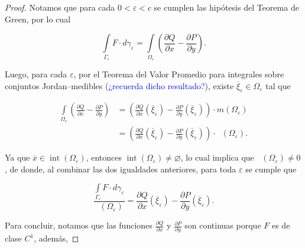 \documentclass[
]{krantz}
\theoremstyle{definition}
\renewcommand{\epsilon}{\varepsilon}  %
\renewcommand{\emptyset}{\varnothing}  %
\theoremstyle{definition}
\theoremstyle{definition}
\theoremstyle{definition}
\theoremstyle{remark}
\begin{document}
\begin{proof}
\iffalse{} {Proof. } \fi{}Notamos que para cada \(0< \epsilon<c\) se cumplen las hipótesis del Teorema de Green, por lo cual

\begin{equation*}
            \displaystyle \int\limits_{\Gamma_{\epsilon}} F\cdot d\gamma_{\epsilon} = \int\limits_{\Omega_{\epsilon}} \left( \frac{\partial Q}{\partial x} - \frac{\partial P}{\partial y} \right).
\end{equation*}

Luego, para cada \(\epsilon\), por el Teorema del Valor Promedio para integrales sobre conjuntos Jordan--medibles (\textcolor{blue}{¿recuerda dicho resultado?}), existe \(\overline{\xi}_{\epsilon}\in \Omega_{\epsilon}\) tal que

\begin{align*}
            \int\limits_{\Omega_{\epsilon}} \left( \frac{\partial Q}{\partial x} - \frac{\partial P}{\partial y} \right) & = \left( \frac{\partial Q}{\partial x}\left(\overline{\xi}_{\epsilon}\right) - \frac{\partial P}{\partial y}\left(\overline{\xi}_{\epsilon}\right) \right) \cdot m\left( \Omega_{\epsilon}\right) \\
            & = \left( \frac{\partial Q}{\partial x}\left(\overline{\xi}_{\epsilon}\right) - \frac{\partial P}{\partial y}\left(\overline{\xi}_{\epsilon}\right) \right) \cdot \mathop{\mathrm{\acute{a}rea}}\left( \Omega_{\epsilon}\right).
\end{align*}

Ya que \(\overline{x}\in\mathop{\mathrm{int}}\left(\Omega_{\epsilon}\right)\), entonces \(\mathop{\mathrm{int}}\left(\Omega_{\epsilon}\right)\neq\emptyset\), lo cual implica que \(\mathop{\mathrm{\acute{a}rea}}\left(\Omega_{\epsilon}\right)\neq 0\), de donde, al combinar las dos igualdades anteriores, para toda \(\epsilon\) se cumple que

\begin{equation*}
        \frac{\displaystyle\int\limits_{\Gamma_{\epsilon}} F\cdot d\gamma_{\epsilon}}{\mathop{\mathrm{\acute{a}rea}}\left(\Omega_{\epsilon}\right)} = \frac{\partial Q}{\partial x}\left(\overline{\xi}_{\epsilon}\right) - \frac{\partial P}{\partial y}\left( \overline{\xi}_{\epsilon}\right).
\end{equation*}

Para concluir, notamos que las funciones \(\frac{\partial Q}{\partial x}\) y \(\frac{\partial P}{\partial y}\) son continuas porque \(F\) es de clase \(C^1\), además,


\end{proof}
\end{document}
